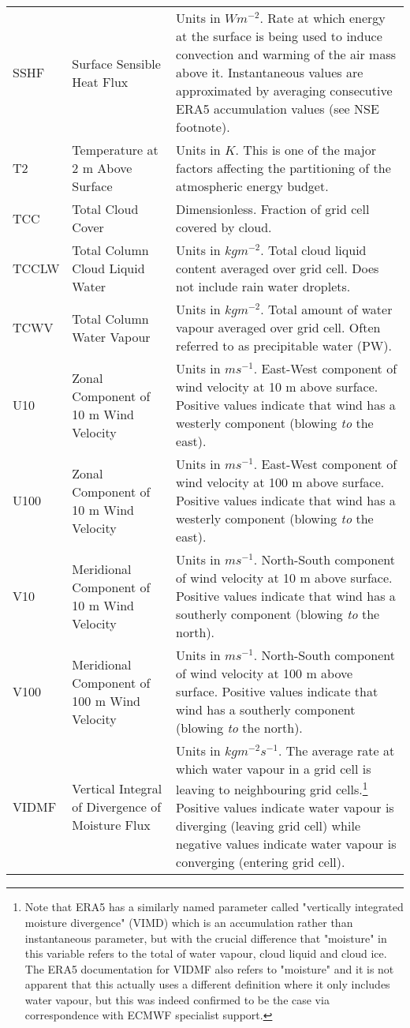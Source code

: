 \begin{landscape}
\begin{longtable}{P{2cm}P{3cm}P{15cm}}
			SSHF & Surface Sensible Heat Flux & Units in $W m^{-2}$. Rate at which energy at the surface is being used to induce convection and warming of the air mass above it. Instantaneous values are approximated by averaging consecutive ERA5 accumulation values (see NSE footnote). \\
			T2 & Temperature at 2 m Above Surface & Units in $K$. This is one of the major factors affecting the partitioning of the atmospheric energy budget. \\
			TCC & Total Cloud Cover & Dimensionless. Fraction of grid cell covered by cloud. \\
			TCCLW & Total Column Cloud Liquid Water & Units in $kg m^{-2}$. Total cloud liquid content averaged over grid cell. Does not include rain water droplets. \\
			TCWV & Total Column Water Vapour & Units in $kg m^{-2}$. Total amount of water vapour averaged over grid cell. Often referred to as precipitable water (PW). \\
			U10 & Zonal Component of 10 m Wind Velocity & Units in $m s^{-1}$. East-West component of wind velocity at 10 m above surface. Positive values indicate that wind has a westerly component (blowing \textit{to} the east). \\
			U100 & Zonal Component of 10 m Wind Velocity & Units in $m s^{-1}$. East-West component of wind velocity at 100 m above surface. Positive values indicate that wind has a westerly component (blowing \textit{to} the east). \\
			V10 & Meridional Component of 10 m Wind Velocity & Units in $m s^{-1}$. North-South component of wind velocity at 10 m above surface. Positive values indicate that wind has a southerly component (blowing \textit{to} the north). \\
			V100 & Meridional Component of 100 m Wind Velocity & Units in $m s^{-1}$. North-South component of wind velocity at 100 m above surface. Positive values indicate that wind has a southerly component (blowing \textit{to} the north). \\
			VIDMF & Vertical Integral of Divergence of Moisture Flux & Units in $kg m^{-2} s^{-1}$. The average rate at which water vapour in a grid cell is leaving to neighbouring grid cells.\footnote{Note that ERA5 has a similarly named parameter called "vertically integrated moisture divergence" (VIMD) which is an accumulation rather than instantaneous parameter, but with the crucial difference that "moisture" in this variable refers to the total of water vapour, cloud liquid and cloud ice. The ERA5 documentation for VIDMF also refers to "moisture" and it is not apparent that this actually uses a different definition where it only includes water vapour, but this was indeed confirmed to be the case via correspondence with ECMWF specialist support.} Positive values indicate water vapour is diverging (leaving grid cell) while negative values indicate water vapour is converging (entering grid cell). \\

\end{longtable}
\end{landscape}
